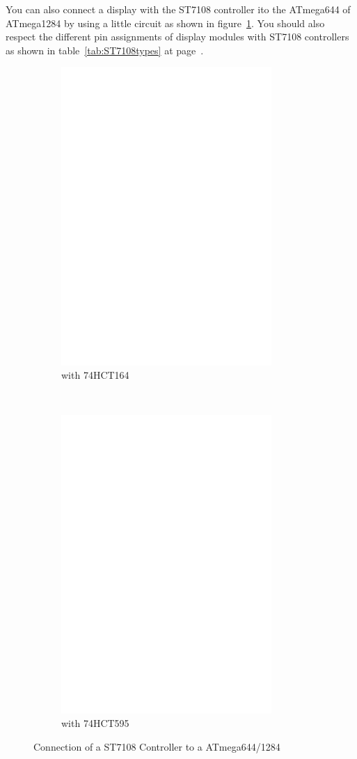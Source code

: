 You can also connect a display with the ST7108 controller ito the ATmega644 of ATmega1284 by using
a little circuit as shown in figure~\ref{fig:ST7108lcd_644}.
You should also respect the different pin assignments of display modules with ST7108 controllers as 
shown in table~\ref{tab:ST7108types} at page~\pageref{tab:ST7108types}.

\begin{figure}[H]
  \begin{subfigure}[b]{9cm}
    \centering
    \includegraphics[width=8cm]{../FIG/ST7108serial164_644.eps}
    \caption{with 74HCT164}
  \end{subfigure}
  ~
  \begin{subfigure}[b]{9cm}
    \centering
    \includegraphics[width=8cm]{../FIG/ST7108serial595_644.eps}
    \caption{with 74HCT595}
  \end{subfigure}
  \caption{Connection of a ST7108 Controller to a ATmega644/1284}
  \label{fig:ST7108lcd_644}
\end{figure}


